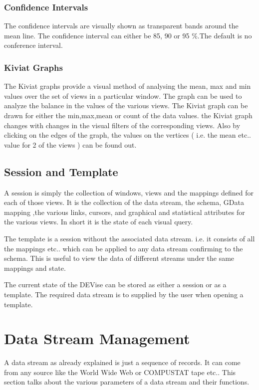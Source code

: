 \subsubsection{Confidence Intervals}

The confidence intervals are visually shown as transparent bands around the mean line. The confidence interval can either be 85, 90  or 95 \%.The default is no conference interval.

\subsubsection{Kiviat Graphs}

The Kiviat graphs provide a visual method of analysing the mean, max and min values over the set of views in a particular window. The graph can be used to analyze the balance in the values of the various views. The Kiviat graph can be drawn for either the min,max,mean or count of the data values. the Kiviat graph changes with changes in the visual filters of the corresponding views. Also by clicking on the edges of the graph, the values on the vertices ( i.e. the mean etc.. value for 2 of the views ) can be found out. 

\subsection{Session and Template}

A session is simply the collection of windows, views and the mappings defined for each of those views. It is the collection of the data stream, the schema, GData  mapping ,the various links, cursors, and graphical and statistical attributes for the various views. In short it is the state of each visual query. 

The template is a session without the associated data stream. i.e. it consists of all the mappings etc.. which can be applied to any data stream confirming to the schema. This is useful to view the data of different streams under the same mappings and state.

The current state of the DEVise can be stored as either a session or as a template. The required data stream is to supplied by the user when opening a template.

\section{Data Stream Management}

A data stream as already explained is just a sequence of records. It can come from any source like the World Wide Web or COMPUSTAT tape etc.. This section talks about the various parameters of a data stream and their functions.

